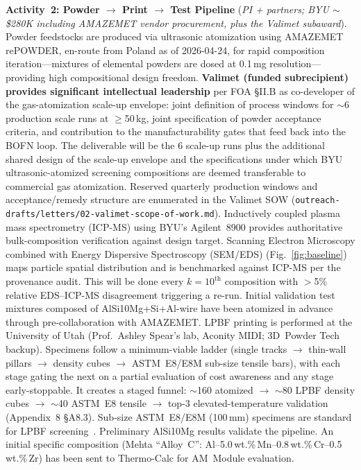 \documentclass[11pt,letterpaper]{article}
\begin{document}
\textbf{Activity~2: Powder $\to$ Print $\to$ Test Pipeline}
(\emph{PI + partners; BYU {$\sim$}\$280K including AMAZEMET vendor procurement, plus the Valimet subaward}).
%
Powder feedstocks are produced via ultrasonic atomization using AMAZEMET
rePOWDER, en-route from Poland as of 2026-04-24, for rapid
composition iteration---mixtures of elemental powders are dosed at
0.1\,mg resolution---providing high
compositional design freedom.
\textbf{Valimet (funded subrecipient) provides significant
intellectual leadership} per FOA \S II.B as co-developer of the
gas-atomization scale-up envelope: joint definition of process windows
for $\sim$6 production scale runs at $\geq$50\,kg, joint specification
of powder acceptance criteria, 
and contribution to the manufacturability gates that feed back into the
BOFN loop. The deliverable will be the 6 scale-up runs plus the additional shared design of the scale-up envelope and the
specifications under which BYU ultrasonic-atomized screening
compositions are deemed transferable to commercial gas atomization.
Reserved quarterly production windows and acceptance/remedy structure
are enumerated in the Valimet SOW
(\texttt{outreach-drafts/letters/02-valimet-scope-of-work.md}).
Inductively coupled plasma mass spectrometry (ICP-MS) using BYU's Agilent~8900 provides authoritative bulk-composition
verification against design target. Scanning Electron Microscopy combined with Energy Dispersive Spectroscopy (SEM/EDS) (Fig.~\ref{fig:baseline})
maps particle spatial distribution and is benchmarked against
ICP-MS per the provenance audit. This will be done every $k{=}10^{\text{th}}$ composition with 
$>$5\% relative EDS--ICP-MS disagreement triggering a re-run. Initial
validation test mixtures composed of AlSi10Mg+Si+Al-wire have been
atomized in advance through pre-collaboration with AMAZEMET.
LPBF printing is performed at the University of Utah (Prof.\ Ashley
Spear's lab, Aconity MIDI; 3D~Powder Tech backup). Specimens follow a
minimum-viable ladder (single tracks $\to$ thin-wall pillars $\to$
density cubes $\to$ ASTM~E8/E8M sub-size tensile bars), with each stage
gating the next on a partial evaluation of cost awareness and any stage
early-stoppable. It creates a staged funnel: $\sim$160 atomized $\to$ $\sim$80 LPBF
density cubes 
$\to$ $\sim$40 ASTM~E8
tensile $\to$ top-3 elevated-temperature validation
(Appendix~8 \S A8.3).
Sub-size ASTM~E8/E8M (100\,mm) specimens are standard for LPBF
screening~\cite{paraschiv_2023_ma16144930,wang_2020_17452759}.
Preliminary AlSi10Mg results validate the pipeline. An initial specific
composition (Mehta ``Alloy~C'':
Al--5.0\,wt.\%\,Mn--0.8\,wt.\%\,Cr--0.5\,wt.\%\,Zr) has been sent to
Thermo-Calc for AM~Module evaluation.
\end{document}
